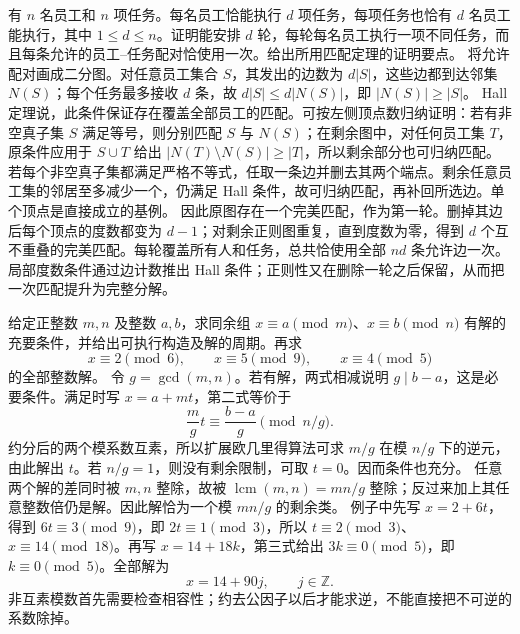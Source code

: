 有 $n$ 名员工和 $n$ 项任务。每名员工恰能执行 $d$ 项任务，每项任务也恰有 $d$ 名员工能执行，其中 $1\le d\le n$。证明能安排 $d$ 轮，每轮每名员工执行一项不同任务，而且每条允许的员工--任务配对恰使用一次。给出所用匹配定理的证明要点。
\solution 将允许配对画成二分图。对任意员工集合 $S$，其发出的边数为 $d|S|$，这些边都到达邻集 $N(S)$；每个任务最多接收 $d$ 条，故 $d|S|\le d|N(S)|$，即 $|N(S)|\ge|S|$。
Hall 定理说，此条件保证存在覆盖全部员工的匹配。可按左侧顶点数归纳证明：若有非空真子集 $S$ 满足等号，则分别匹配 $S$ 与 $N(S)$；在剩余图中，对任何员工集 $T$，原条件应用于 $S\cup T$ 给出 $|N(T)\setminus N(S)|\ge|T|$，所以剩余部分也可归纳匹配。
若每个非空真子集都满足严格不等式，任取一条边并删去其两个端点。剩余任意员工集的邻居至多减少一个，仍满足 Hall 条件，故可归纳匹配，再补回所选边。单个顶点是直接成立的基例。
因此原图存在一个完美匹配，作为第一轮。删掉其边后每个顶点的度数都变为 $d-1$；对剩余正则图重复，直到度数为零，得到 $d$ 个互不重叠的完美匹配。每轮覆盖所有人和任务，总共恰使用全部 $nd$ 条允许边一次。
\insight 局部度数条件通过边计数推出 Hall 条件；正则性又在删除一轮之后保留，从而把一次匹配提升为完整分解。

给定正整数 $m,n$ 及整数 $a,b$，求同余组 $x\equiv a\pmod m$、$x\equiv b\pmod n$ 有解的充要条件，并给出可执行构造及解的周期。再求
\[
 x\equiv2\pmod6,\qquad x\equiv5\pmod9,
 \qquad x\equiv4\pmod5
\]
的全部整数解。
\solution 令 $g=\gcd(m,n)$。若有解，两式相减说明 $g\mid b-a$，这是必要条件。满足时写 $x=a+mt$，第二式等价于
\[
 \frac m g t\equiv\frac{b-a}{g}\pmod{n/g}.
\]
约分后的两个模系数互素，所以扩展欧几里得算法可求 $m/g$ 在模 $n/g$ 下的逆元，由此解出 $t$。若 $n/g=1$，则没有剩余限制，可取 $t=0$。因而条件也充分。
任意两个解的差同时被 $m,n$ 整除，故被 $\operatorname{lcm}(m,n)=mn/g$ 整除；反过来加上其任意整数倍仍是解。因此解恰为一个模 $mn/g$ 的剩余类。
例子中先写 $x=2+6t$，得到 $6t\equiv3\pmod9$，即 $2t\equiv1\pmod3$，所以 $t\equiv2\pmod3$、$x\equiv14\pmod{18}$。再写 $x=14+18k$，第三式给出 $3k\equiv0\pmod5$，即 $k\equiv0\pmod5$。全部解为
\[
 \boxed{x=14+90j,\qquad j\in\mathbb Z}.
\]
\insight 非互素模数首先需要检查相容性；约去公因子以后才能求逆，不能直接把不可逆的系数除掉。

